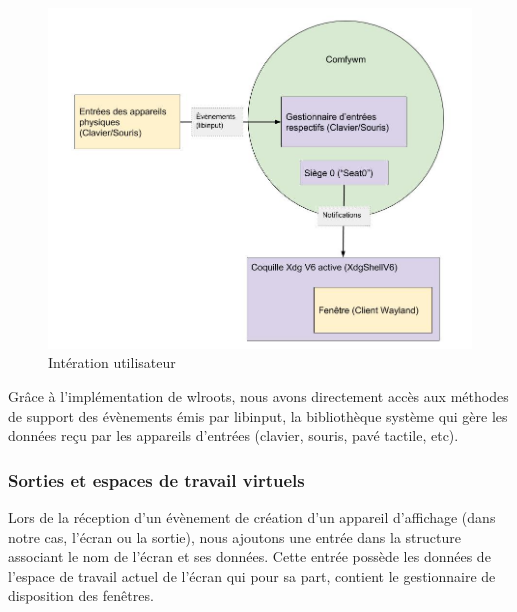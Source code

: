 \documentclass[titlepage]{article}
\begin{document}
\begin{figure}[H]
	\centering
	\includegraphics[width=\textwidth]{interaction_utilisateur.jpg}
	\caption{Intération utilisateur}
\end{figure}

\par
Grâce à l'implémentation de wlroots, nous avons directement accès aux méthodes de support des évènements émis par libinput, la bibliothèque système qui gère les données reçu par les appareils d'entrées (clavier, souris, pavé tactile, etc).
\bigskip

\subsubsection{Sorties et espaces de travail virtuels}
\par
Lors de la réception d'un évènement de création d'un appareil d'affichage (dans notre cas, l'écran ou la sortie), nous ajoutons une entrée dans la structure associant le nom de l'écran et ses données. Cette entrée possède les données de l'espace de travail actuel de l'écran qui pour sa part, contient le gestionnaire de disposition des fenêtres.
\bigskip
\end{document}
